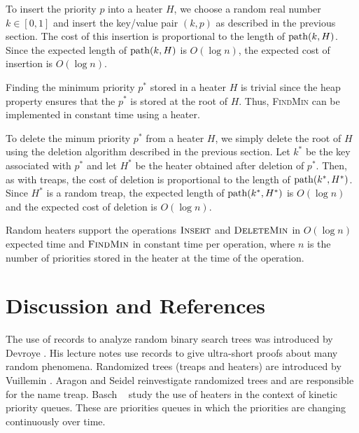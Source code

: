 To insert the priority $p$ into a heater $H$, we choose a random real
number $k\in [0,1]$ and insert the key/value pair $(k,p)$ as described
in the previous section.  The cost of this insertion is proportional
to the length of $\mathrm{path}(k,H)$.  Since the expected length of
$\mathrm{path}(k,H)$ is $O(\log n)$, the expected cost of insertion is $O(\log
n)$.

Finding the minimum priority $p^*$ stored in a heater $H$ is trivial
since the heap property ensures that the $p^*$ is stored at the root
of $H$.  Thus, \textsc{FindMin} can be implemented in constant time
using a heater.

To delete the minum priority $p^*$ from a heater $H$, we simply delete
the root of $H$ using the deletion algorithm described in the previous
section.  Let $k^*$ be the key associated with $p^*$ and let $H^*$ be
the heater obtained after deletion of $p^*$.  Then, as with treaps,
the cost of deletion is proportional to the length of
$\mathrm{path}(k^*,H^*)$.  Since $H^*$ is a random treap, the expected length
of $\mathrm{path}(k^*,H^*)$ is $O(\log n)$ and the expected cost of deletion
is $O(\log n)$.

\begin{thm}
Random heaters support the operations $\textsc{Insert}$ and
$\textsc{DeleteMin}$ in $O(\log n)$ expected time and
$\textsc{FindMin}$ in constant time per operation, where $n$ is the
number of priorities stored in the heater at the time of the
operation.
\end{thm}

\section{Discussion and References}

The use of records to analyze random binary search trees was
introduced by \mbox{Devroye} \cite{d88}.  His lecture notes \cite{d01}
use records to give ultra-short proofs about many random phenomena.
Randomized trees (treaps and heaters) are introduced by Vuillemin
\cite{v80}.  \mbox{Aragon} and
\mbox{Seidel} \cite{as96} reinvestigate randomized trees and are
responsible for the name treap.  Basch \etal\ \cite{bgr96} study the
use of heaters in the context of kinetic priority queues.  These are
priorities queues in which the priorities are changing continuously
over time.





